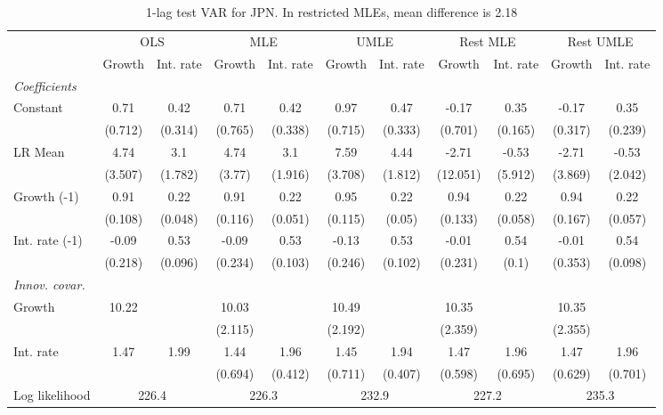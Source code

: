 \begin{table}[htbp] 
	\centering
	\begin{tabular}{@{\extracolsep{4pt}}lcccccccccc@{}}		\hline\hline
		 		 & \multicolumn{2}{c}{OLS} &\multicolumn{2}{c}{MLE} &\multicolumn{2}{c}{UMLE} &\multicolumn{2}{c}{Rest MLE} &\multicolumn{2}{c}{Rest UMLE} \\ 
 		 & Growth 	 & Int. rate 	 & Growth 	 & Int. rate 	 & Growth 	 & Int. rate 	 & Growth 	 & Int. rate 	 & Growth 	 & Int. rate\\\cline{2-3}\cline{4-5}\cline{6-7}\cline{8-9}\cline{10-11}
\rule{0pt}{4ex} 
 \emph{Coefficients} 	  		 & 		 & 		 & 		 & 		 & 		 & 		 & 		 & 		 & 		 &\\ 
\quad Constant 	 & 0.71 	 & 0.42 	 & 0.71 	 & 0.42 	 & 0.97 	 & 0.47 	 & -0.17 	 & 0.35 	 & -0.17 	 & 0.35	 \\ 
 		 & (0.712) 	 & (0.314) 	 & (0.765) 	 & (0.338) 	 & (0.715) 	 & (0.333) 	 & (0.701) 	 & (0.165) 	 & (0.317) 	 & (0.239) 	 \\ 
\quad LR Mean 	 & 4.74 	 & 3.1 	 & 4.74 	 & 3.1 	 & 7.59 	 & 4.44 	 & -2.71 	 & -0.53 	 & -2.71 	 & -0.53	 \\ 
 		 & (3.507) 	 & (1.782) 	 & (3.77) 	 & (1.916) 	 & (3.708) 	 & (1.812) 	 & (12.051) 	 & (5.912) 	 & (3.869) 	 & (2.042) 	 \\ 
\quad Growth (-1) 	 &0.91 	 & 0.22 	 & 0.91 	 & 0.22 	 & 0.95 	 & 0.22 	 & 0.94 	 & 0.22 	 & 0.94 	 & 0.22	 \\ 
 		 & (0.108) 	 & (0.048) 	 & (0.116) 	 & (0.051) 	 & (0.115) 	 & (0.05) 	 & (0.133) 	 & (0.058) 	 & (0.167) 	 & (0.057) 	 \\ 
\quad Int. rate (-1) 	 &-0.09 	 & 0.53 	 & -0.09 	 & 0.53 	 & -0.13 	 & 0.53 	 & -0.01 	 & 0.54 	 & -0.01 	 & 0.54	 \\ 
 		 & (0.218) 	 & (0.096) 	 & (0.234) 	 & (0.103) 	 & (0.246) 	 & (0.102) 	 & (0.231) 	 & (0.1) 	 & (0.353) 	 & (0.098) 	 \\ 
\rule{0pt}{4ex} \emph{Innov. covar.}  	 & 	 & 	 & 	 & 	 & 	 & 	 & 	 & 	 & 	 &\\ 
\quad Growth 	 &10.22 	 &  	 & 10.03 	 &  	 & 10.49 	 &  	 & 10.35 	 &  	 & 10.35 	 & 	 \\ 
 		 &  	 &  	 & (2.115) 	 &  	 & (2.192) 	 &  	 & (2.359) 	 &  	 & (2.355) 	 &  	 \\ 
\quad Int. rate 	 &1.47 	 & 1.99 	 & 1.44 	 & 1.96 	 & 1.45 	 & 1.94 	 & 1.47 	 & 1.96 	 & 1.47 	 & 1.96	 \\ 
 		 &  	 &  	 & (0.694) 	 & (0.412) 	 & (0.711) 	 & (0.407) 	 & (0.598) 	 & (0.695) 	 & (0.629) 	 & (0.701) 	 \\ 
 \hline \rule{0pt}{4ex} 
  Log likelihood 	 &\multicolumn{2}{c}{226.4} 	 & \multicolumn{2}{c}{226.3} 	 & \multicolumn{2}{c}{232.9} 	 & \multicolumn{2}{c}{227.2} 	 & \multicolumn{2}{c}{235.3}\\ 

 \hline 	\end{tabular}		\caption{1-lag test VAR for JPN. In restricted MLEs, mean difference is 2.18}
		\label{tab:JPN1lag}

\end{table}